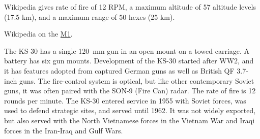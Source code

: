 \begin{withcounters}
{        Wikipedia gives rate of fire of 12 RPM, a maximum altitude of 57 altitude levels (17.5 km), and a maximum range of 50 hexes (25 km).

        \begin{notesources}
            \item Wikipedia on the \href{https://en.wikipedia.org/wiki/120_mm_gun_M1}{M1}.
        \end{notesources}
    }


    The KS-30 has a single 120~mm gun in an open mount on a towed carriage.
    A battery has six gun mounts.
    Development of the KS-30 started after WW2, and it has features adopted from captured German guns as well as British QF 3.7-inch guns.
    The fire-control system is optical, but like other contemporary Soviet guns, it was often paired with the SON-9 (Fire Can) radar. The rate of fire is 12 rounds per minute.
    The KS-30 entered service in 1955 with Soviet forces, was used to defend strategic sites, and served until 1962. It was not widely exported, but also served with the North Vietnamese forces in the Vietnam War and Iraqi forces in the Iran-Iraq and Gulf Wars.%


\end{withcounters}
